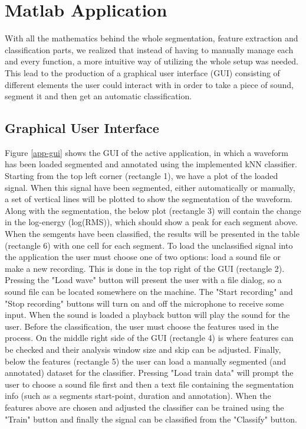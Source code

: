 \section{Matlab Application}
With all the mathematics behind the whole segmentation, feature extraction and classification parts, we realized that instead of having to manually manage each and every function, a more intuitive way of utilizing the whole setup was needed. This lead to the production of a graphical user interface (GUI) consisting of different elements the user could interact with in order to take a piece of sound, segment it and then get an automatic classification.

\subsection{Graphical User Interface}
Figure \ref{app-gui} shows the GUI of the active application, in which a waveform has been loaded segmented and annotated using the implemented kNN classifier. Starting from the top left corner (rectangle 1), we have a plot of the loaded signal. When this signal have been segmented, either automatically or manually, a set of vertical lines will be plotted to show the segmentation of the waveform. Along with the segmentation, the below plot (rectangle 3) will contain the change in the log-energy (log(RMS)), which should show a peak for each segment above. When the semgents have been classified, the results will be presented in the table (rectangle 6) with one cell for each segment. To load the unclassified signal into the application the user must choose one of two options: load a sound file or make a new recording. This is done in the top right of the GUI (rectangle 2). Pressing the "Load wave" button will present the user with a file dialog, so a sound file can be located somewhere on the machine. The "Start recording" and "Stop recording" buttons will turn on and off the microphone to receive some input. When the sound is loaded a playback button will play the sound for the user. Before the classification, the user must choose the features used in the process. On the middle right side of the GUI (rectangle 4) is where features can be checked and their analysis window size and skip can be adjusted. Finally, below the features (rectangle 5) the user can load a manually segmented (and annotated) dataset for the classifier. Pressing "Load train data" will prompt the user to choose a sound file first and then a text file containing the segmentation info (such as a segments start-point, duration and annotation). When the features above are chosen and adjusted the classifier can be trained using the "Train" button and finally the signal can be classified from the "Classify" button.

